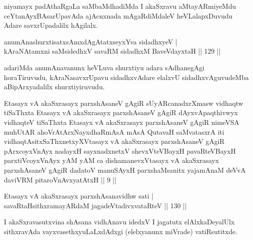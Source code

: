 \begin{artha}%
niyamayx padAthaRgaLa saMbaMdhadiMda I akaSxravu aMtayARmiyeMdu ceYtanAyxBAsarUpavAda ajAcnxnada mAgaRdiMdaleV heVLalapxDuvudu Adare savxrUpadalilx hAgilalx.
\end{artha}

\begin{shl}
anumAnashurxtisatxsAmxdAgAtatxseyxYva sidadhxyeV |\\
kAraNAtamxni saMsidedhxV savaRM sidadhxM BaveVdayxtaH \hfill || 129 ||
\end{shl}

\begin{artha}
adariMda anumAnavanunx heVLuva shurxtiyu adara sAdhanegAgi horaTiruvudu, kAraNasavxrUpavu sidadhxvAdare elalxvU sidadhxvAguvudeMba aBipArxyadalilx shurxtiyiruvudu.
\end{artha}



\begin{kandikeshl}
Etasayx vA akaSxrasayx parxshAsaneV gAgiR sUyARcanadxrXmasw vidhaqtw tiSaThxta Etasayx vA akaSxrasayx parxshAsaneV gAgiR dAyxvApaqthivwyx vidhaqteV tiSaThxta Etasayx vA akaSxrasayx parxshAsaneV gAgiR nimeVSA muhUtAR ahoVrAtArxNayxdhaRmAsA mAsA QutavaH saMvatasxrA iti vidhaqtAsitxSaThxnetxyXVtasayx vA akaSxrasayx parxshAsaneV gAgiR pArxcoyxV\s nAyx nadayxH sayxnadxnetxV shevxVteVBayxH pavaRteVBayxH parxtiVcoyxV\s nAyx yAM yAM ca dishamanevxVtasayx vA akaSxrasayx parxshAsaneV gAgiR dadatoV manuSAyxH parxshaMsanitx yajamAnaM deVvA daviVRM pitaroV\s nAvxyatAtxH || 9 ||
\end{kandikeshl}


\begin{shl}
Etasayx vA akaSxrasayx parxshAsanavidhw sati |\\
savaRtaHsithxramayARdaM jagadeVtadivxvataRteV \hfill || 130 ||
\end{shl}

\begin{artha}%
I akaSxravasutxvina shAsana vidhAnavu idedxV I jagatutx elAlxkaDeyalUlx sithxravAda vayxvasethxyuLaLxdAdxgi (elelxyanunx miVrade) vatiRsutitxde.
\end{artha}

